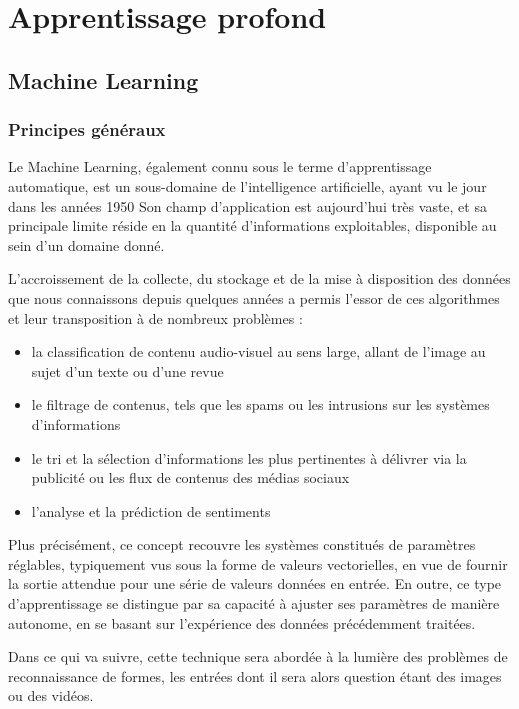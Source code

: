 \documentclass[12pt]{report}
\begin{document}
\chapter{Apprentissage profond}

\section{Machine Learning}

\subsection{Principes généraux}

Le Machine Learning, également connu sous le terme d'apprentissage automatique, est un sous-domaine de l'intelligence artificielle, ayant vu le jour dans
les années 1950\cite{Bib_Marr}\cite{Bib_McCar}
Son champ d'application est aujourd'hui très vaste, et sa principale limite réside en la quantité d'informations exploitables, disponible au sein d'un domaine donné.


L'accroissement de la collecte, du stockage et de la mise à disposition des données que nous connaissons depuis quelques années a permis l'essor de ces algorithmes et leur transposition à de nombreux problèmes :

\begin{itemize}
  \item la classification de contenu audio-visuel au sens large, allant de l'image au sujet d'un texte ou d'une revue
  \item le filtrage de contenus, tels que les spams ou les intrusions sur les systèmes d'informations
  \item le tri et la sélection d'informations les plus pertinentes à délivrer via la publicité ou les flux de contenus des médias sociaux
  \item l'analyse et la prédiction de sentiments
\end{itemize}

Plus précisément, ce concept recouvre les systèmes constitués de paramètres réglables, typiquement vus sous la forme de
valeurs vectorielles, en vue de fournir la sortie attendue pour une série de valeurs données en entrée. En outre, ce type d'apprentissage se distingue
par sa capacité à ajuster ses paramètres de manière autonome, en se basant sur l'expérience des données précédemment traitées.

Dans ce qui va suivre, cette technique sera abordée à la lumière des problèmes de reconnaissance de formes, les entrées dont il sera alors question étant des images ou des vidéos.
\end{document}
